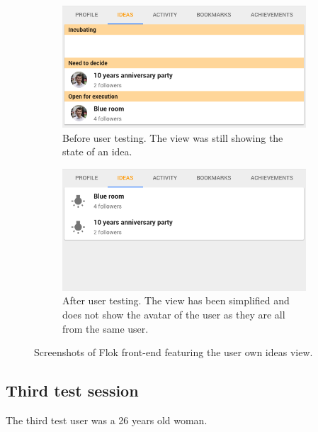 \documentclass[a4paper,12pt,twoside]{article}
\begin{document}
\begin{figure}[!htb]
    \begin{subfigure}[t]{.495\textwidth}
        \includegraphics[width=\textwidth]{images/user_tests/personIdeas_before.png}
        \caption{Before user testing. The view was still showing the state of an idea.}
        \label{fig.tests.personIdeas.before}
    \end{subfigure}
    \hfill
    \begin{subfigure}[t]{.495\textwidth}
        \includegraphics[width=\textwidth]{images/user_tests/personIdeas_after.png}
        \caption{After user testing. The view has been simplified and does not show the avatar of the user as they are all from the same user.}
        \label{fig.tests.personIdeas.after}
    \end{subfigure}
    \caption{Screenshots of Flok front-end featuring the user own ideas view.}
    \label{fig.tests.personIdeas}
\end{figure}

\FloatBarrier
\subsection{Third test session}
The third test user was a 26 years old woman.
\end{document}
